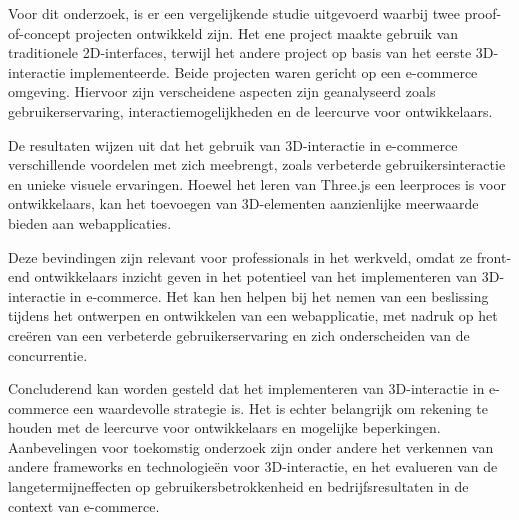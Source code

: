 Voor dit onderzoek, is er een vergelijkende studie uitgevoerd waarbij twee proof-of-concept projecten ontwikkeld zijn. Het ene project maakte gebruik van traditionele 2D-interfaces, terwijl het andere project op basis van het eerste 3D-interactie implementeerde. Beide projecten waren gericht op een e-commerce omgeving. Hiervoor zijn verscheidene aspecten zijn geanalyseerd zoals gebruikerservaring, interactiemogelijkheden en de leercurve voor ontwikkelaars.

De resultaten wijzen uit dat het gebruik van 3D-interactie in e-commerce verschillende voordelen met zich meebrengt, zoals verbeterde gebruikersinteractie en unieke visuele ervaringen. Hoewel het leren van Three.js een leerproces is voor ontwikkelaars, kan het toevoegen van 3D-elementen aanzienlijke meerwaarde bieden aan webapplicaties.

Deze bevindingen zijn relevant voor professionals in het werkveld, omdat ze front-end ontwikkelaars inzicht geven in het potentieel van het implementeren van 3D-interactie in e-commerce. Het kan hen helpen bij het nemen van een beslissing tijdens het ontwerpen en ontwikkelen van een webapplicatie, met nadruk op het creëren van een verbeterde gebruikerservaring en zich onderscheiden van de concurrentie.

Concluderend kan worden gesteld dat het implementeren van 3D-interactie in e-commerce een waardevolle strategie is. Het is echter belangrijk om rekening te houden met de leercurve voor ontwikkelaars en mogelijke beperkingen. Aanbevelingen voor toekomstig onderzoek zijn onder andere het verkennen van andere frameworks en technologieën voor 3D-interactie, en het evalueren van de langetermijneffecten op gebruikersbetrokkenheid en bedrijfsresultaten in de context van e-commerce.